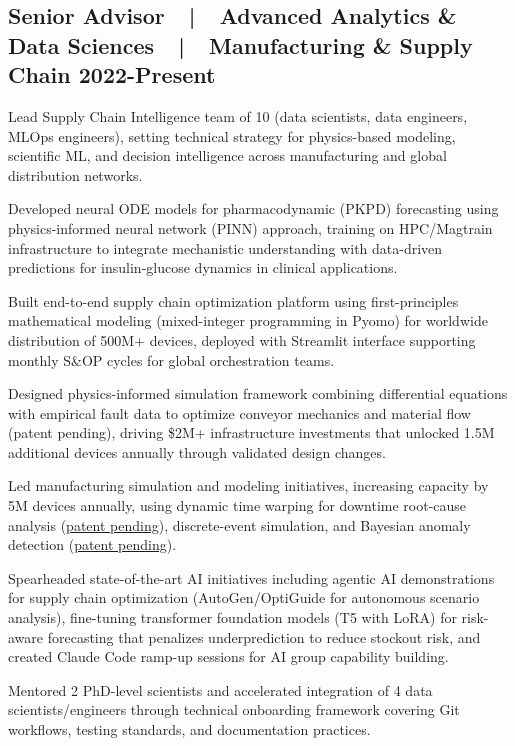 \subsection{{Senior Advisor~~|~~Advanced Analytics \& Data Sciences~~|~~Manufacturing \& Supply Chain \hfill 2022-Present}}
\begin{zitemize}
\item Lead Supply Chain Intelligence team of 10 (data scientists, data engineers, MLOps engineers), setting technical strategy for physics-based modeling, scientific ML, and decision intelligence across manufacturing and global distribution networks.
\item Developed neural ODE models for pharmacodynamic (PKPD) forecasting using physics-informed neural network (PINN) approach, training on HPC/Magtrain infrastructure to integrate mechanistic understanding with data-driven predictions for insulin-glucose dynamics in clinical applications.
\item Built end-to-end supply chain optimization platform using first-principles mathematical modeling (mixed-integer programming in Pyomo) for worldwide distribution of 500M+ devices, deployed with Streamlit interface supporting monthly S\&OP cycles for global orchestration teams.
\item Designed physics-informed simulation framework combining differential equations with empirical fault data to optimize conveyor mechanics and material flow {\color{customcolor}(patent pending)}, driving \$2M+ infrastructure investments that unlocked 1.5M additional devices annually through validated design changes.
\item Led manufacturing simulation and modeling initiatives, increasing capacity by 5M devices annually, using dynamic time warping for downtime root-cause analysis {\color{customcolor}(\href{https://patentimages.storage.googleapis.com/d4/d0/1b/d48d12b6300876/WO2025024213A1.pdf}{patent pending})}, discrete-event simulation, and Bayesian anomaly detection {\color{customcolor}(\href{https://patentimages.storage.googleapis.com/7b/4f/d7/72b2ad78d1f6c6/WO2025034690A1.pdf}{patent pending})}.
\item Spearheaded state-of-the-art AI initiatives including agentic AI demonstrations for supply chain optimization (AutoGen/OptiGuide for autonomous scenario analysis), fine-tuning transformer foundation models (T5 with LoRA) for risk-aware forecasting that penalizes underprediction to reduce stockout risk, and created Claude Code ramp-up sessions for AI group capability building.
\item Mentored 2 PhD-level scientists and accelerated integration of 4 data scientists/engineers through technical onboarding framework covering Git workflows, testing standards, and documentation practices.
\end{zitemize}

